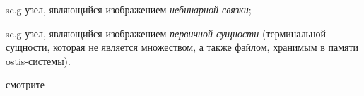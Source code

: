 \begin{SCn}
\begin{scnstruct}
\begin{scnsubstruct}
{\begin{scnitemize}
                    \item sc.g-узел, являющийся изображением \textit{небинарной связки};
                    \item sc.g-узел, являющийся изображением \textit{первичной сущности} (терминальной сущности, которая не является множеством, а также файлом, хранимым в памяти ostis-системы).
            \end{scnitemize}}
            \begin{scnindent}
                \begin{scnrelfromset}{смотрите}
                \end{scnrelfromset}
            \end{scnindent}



\end{scnsubstruct}
\end{scnstruct}
\end{SCn}
